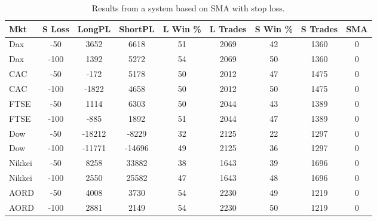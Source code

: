 \begin{table}[ht]
\centering
\caption[Results from a system based on SMA with stop loss]{Results from a system based on SMA with stop loss.} 
\label{tab:sma_results_Sloss}
\begin{tabular}{lcccccccc}
  \toprule Mkt & S Loss & LongPL & ShortPL & L Win \% & L Trades & S Win \% & S Trades & SMA \\ 
  \midrule Dax & -50 & 3652 & 6618 & 51 & 2069 & 42 & 1360 & 0 \\ 
  Dax & -100 & 1392 & 5272 & 54 & 2069 & 50 & 1360 & 0 \\ 
  CAC & -50 & -172 & 5178 & 50 & 2012 & 47 & 1475 & 0 \\ 
  CAC & -100 & -1822 & 4658 & 50 & 2012 & 50 & 1475 & 0 \\ 
  FTSE & -50 & 1114 & 6303 & 50 & 2044 & 43 & 1389 & 0 \\ 
  FTSE & -100 & -885 & 1892 & 51 & 2044 & 47 & 1389 & 0 \\ 
  Dow & -50 & -18212 & -8229 & 32 & 2125 & 22 & 1297 & 0 \\ 
  Dow & -100 & -11771 & -14696 & 49 & 2125 & 36 & 1297 & 0 \\ 
  Nikkei & -50 & 8258 & 33882 & 38 & 1643 & 39 & 1696 & 0 \\ 
  Nikkei & -100 & 2550 & 25582 & 47 & 1643 & 48 & 1696 & 0 \\ 
  AORD & -50 & 4008 & 3730 & 54 & 2230 & 49 & 1219 & 0 \\ 
  AORD & -100 & 2881 & 2149 & 54 & 2230 & 50 & 1219 & 0 \\ 
   \bottomrule \end{tabular}
\end{table}
